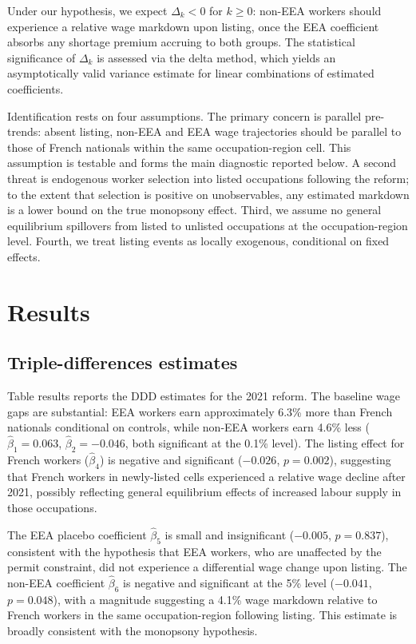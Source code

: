 \documentclass[9pt]{article}
\begin{document}
Under our hypothesis, we expect $\Delta_k < 0$ for $k \geq 0$:
non-EEA workers should experience a relative wage markdown upon listing,
once the EEA coefficient absorbs any shortage premium accruing to both
groups. The statistical significance of $\Delta_k$ is assessed via the
delta method, which yields an asymptotically valid variance estimate for
linear combinations of estimated coefficients.

Identification rests on four assumptions.
The primary concern is parallel pre-trends: absent listing, non-EEA and
EEA wage trajectories should be parallel to those of French nationals
within the same occupation-region cell. This assumption is testable and
forms the main diagnostic reported below. A second threat is endogenous
worker selection into listed occupations following the reform; to the
extent that selection is positive on unobservables, any estimated markdown
is a lower bound on the true monopsony effect. Third, we assume no general
equilibrium spillovers from listed to unlisted occupations at the
occupation-region level. Fourth, we treat listing events as locally
exogenous, conditional on fixed effects.

\section{Results}
\label{sec:results}


\subsection{Triple-differences estimates}

Table results reports the DDD estimates for the 2021 reform. The baseline
wage gaps are substantial: EEA workers earn approximately 6.3\% more than French
nationals conditional on controls, while non-EEA workers earn 4.6\% less
($\hat\beta_1 = 0.063$, $\hat\beta_2 = -0.046$, both significant at the 0.1\%
level). The listing effect for French workers ($\hat\beta_4$) is negative and
significant ($-0.026$, $p = 0.002$), suggesting that French workers in newly-listed
cells experienced a relative wage decline after 2021, possibly reflecting general
equilibrium effects of increased labour supply in those occupations.

The EEA placebo coefficient $\hat\beta_5$ is small and insignificant
($-0.005$, $p = 0.837$), consistent with the hypothesis that EEA workers, who
are unaffected by the permit constraint, did not experience a differential wage
change upon listing. The non-EEA coefficient $\hat\beta_6$ is negative and
significant at the 5\% level ($-0.041$, $p = 0.048$), with a magnitude suggesting
a 4.1\% wage markdown relative to French workers in the same occupation-region
following listing. This estimate is broadly consistent with the monopsony hypothesis.
\end{document}
